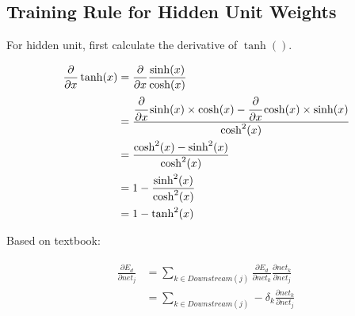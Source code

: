 \documentclass[preview]{standalone}
\begin{document}
\subsection{Training Rule for Hidden Unit Weights}
For hidden unit, first calculate the derivative of $\tanh()$.

\begin{align}
\label{tanhderiv}
\begin{split}
\frac{\partial}{\partial x}\tanh(x)
&=\frac{\partial}{\partial x}\frac{\sinh(x)}{\cosh(x)}\\
&=\cfrac{\cfrac{\partial}{\partial
    x}\sinh(x)\times\cosh(x)-\cfrac{\partial}{\partial
    x}\cosh(x)\times\sinh(x)}{\cosh^2(x)}\\
&=\frac{\cosh^2(x)-\sinh^2(x)}{\cosh^2(x)}\\
&=1-\frac{\sinh^2(x)}{\cosh^2(x)}\\
&=1-\tanh^2(x)
\end{split}
\end{align}

Based on textbook:

\begin{align}
\label{i0}
\begin{split}
\frac{\partial E_d}{\partial net_j}
&=\sum_{{k}\in{Downstream(j)}}\frac{\partial E_d}{\partial net_{{k}}}\frac{\partial net_{{k}}}{\partial net_{j}}\\
&=\sum_{{k}\in{Downstream(j)}}-\delta_{{k}}\frac{\partial net_{{k}}}{\partial net_{j}}
\end{split}
\end{align}



\end{document}
